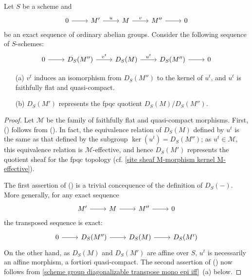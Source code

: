 \begin{theorem}\label{scheme group diagonalizable exact sequence prop}
Let $S$ be a scheme and
\[\begin{tikzcd}
0\ar[r]&M'\ar[r,"u"]&M\ar[r,"v"]&M''\ar[r]&0
\end{tikzcd}\]
be an exact sequence of ordinary abelian groups. Consider the following sequence of $S$-schemes:
\[\begin{tikzcd}
0\ar[r]&D_S(M'')\ar[r,"v^t"]&D_S(M)\ar[r,"u^t"]&D_S(M'')\ar[r]&0
\end{tikzcd}\]
\begin{enumerate}
    \item[(a)] $v^t$ induces an isomorphism from $D_S(M'')$ to the kernel of $u^t$, and $u^t$ is faithfully flat and quasi-compact.
    \item[(b)] $D_S(M')$ represents the fpqc quotient $D_S(M)/D_S(M'')$.
\end{enumerate}
\end{theorem}
\begin{proof}
Let $\mathcal{M}$ be the family of faithfully flat and quasi-compact morphisms. First, () follows from (). In fact, the equivalence relation of $D_S(M)$ defined by $u^t$ is the same as that defined by the subgroup $\ker(u^t)=D_S(M'')$; as $u^t\in\mathscr{M}$,  this equivalence relation is $\mathcal{M}$-effective, and hence $D_S(M')$ represents the quotient sheaf for the fpqc topology (cf. \cref{site sheaf M-morphism kernel M-effective}).\par
The first assertion of () is a trivial concequence of the definition of $D_S(-)$. More generally, for any exact sequence
\[\begin{tikzcd}
M'\ar[r]&M\ar[r]&M''\ar[r]&0
\end{tikzcd}\]
the transposed sequence is exact:
\[\begin{tikzcd}
0\ar[r]&D_S(M'')\ar[r]&D_S(M)\ar[r]&D_S(M')
\end{tikzcd}\]
On the other hand, as $D_S(M)$ and $D_S(M')$ are affine over $S$, $u^t$ is necessarily an affine morphism, a fortiori quasi-compact. The second assertion of () now follows from \cref{scheme group diagonalizable transpose mono epi iff}~(a) below. 
\end{proof}


